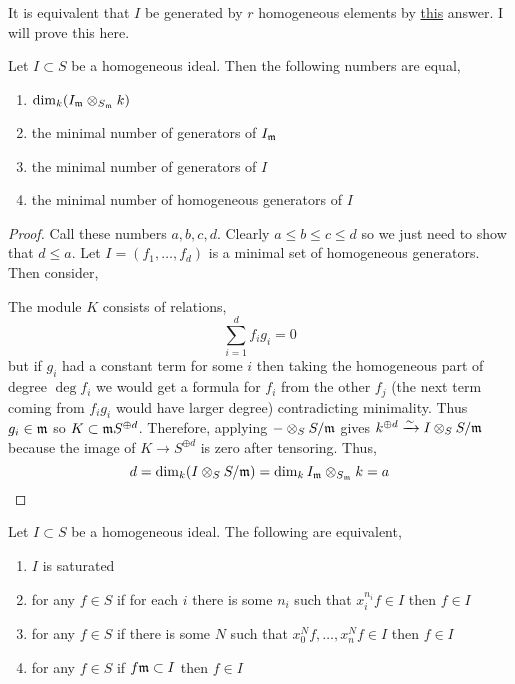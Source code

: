 \documentclass[12pt]{article}
\begin{document}
\begin{rmk}
It is equivalent that $I$ be generated by $r$ homogeneous elements by \href{https://mathoverflow.net/questions/15584/minimal-number-of-generators-of-a-homogeneous-ideal-exercise-in-hartshorne}{this} answer. I will prove this here.
\end{rmk}

\begin{lemma} \label{controlled_at_cone_point}
Let $I \subset S$ be a homogeneous ideal. Then the following numbers are equal,
\begin{enumerate}
\item $\dim_{k} (I_{\mathfrak{m}} \otimes_{S_{\mathfrak{m}}} k)$
\item the minimal number of generators of $I_{\mathfrak{m}}$
\item the minimal number of generators of $I$
\item the minimal number of homogeneous generators of $I$
\end{enumerate}
\end{lemma}


\begin{proof}
Call these numbers $a,b,c,d$. Clearly $a \le b \le c \le d$ so we just need to show that $d \le a$. Let $I = (f_1, \dots, f_d)$ is a minimal set of homogeneous generators. Then consider,
\begin{center}
\end{center}
The module $K$ consists of relations,
\[ \sum_{i = 1}^d f_i g_i = 0 \]
but if $g_i$ had a constant term for some $i$ then taking the homogeneous part of degree $\deg{f_i}$ we would get a formula for $f_i$ from the other $f_j$ (the next term coming from $f_i g_i$ would have larger degree) contradicting minimality. Thus $g_i \in \mathfrak{m}$ so $K \subset \mathfrak{m} S^{\oplus d}$. Therefore, applying $- \otimes_S S/\mathfrak{m}$ gives $k^{\oplus d} \xrightarrow{\sim} I \otimes_S S/\mathfrak{m}$ because the image of $K \to S^{\oplus d}$ is zero after tensoring. Thus,
\[ d = \dim_{k} (I \otimes_S S/\mathfrak{m}) = \dim_k I_{\mathfrak{m}} \otimes_{S_{\mathfrak{m}}} k = a \]
\end{proof}

\begin{lemma} 
Let $I \subset S$ be a homogeneous ideal. The following are equivalent,
\begin{enumerate}
\item $I$ is saturated
\item for any $f \in S$ if for each $i$ there is some $n_i$ such that $x_i^{n_i} f \in I$ then $f \in I$
\item for any $f \in S$ if there is some $N$ such that $x_0^N f, \dots, x_n^N f \in I$ then $f \in I$
\item for any $f \in S$ if $f \mathfrak{m} \subset I$ then $f \in I$
\end{enumerate}
\end{lemma}
\end{document}

